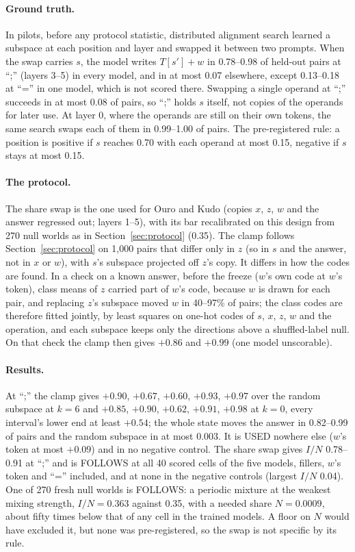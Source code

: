 \documentclass{article}
\begin{document}
\paragraph{Ground truth.} In pilots, before any protocol statistic, distributed alignment search \citep{geiger2024finding} learned a subspace at each position and layer and swapped it between two prompts. When the swap carries $s$, the model writes $T[s'] + w$ in 0.78--0.98 of held-out pairs at ``;'' (layers 3--5) in every model, and in at most 0.07 elsewhere, except 0.13--0.18 at ``='' in one model, which is not scored there. Swapping a single operand at ``;'' succeeds in at most 0.08 of pairs, so ``;'' holds $s$ itself, not copies of the operands for later use. At layer 0, where the operands are still on their own tokens, the same search swaps each of them in 0.99--1.00 of pairs. The pre-registered rule: a position is positive if $s$ reaches 0.70 with each operand at most 0.15, negative if $s$ stays at most 0.15.

\paragraph{The protocol.} The share swap is the one used for Ouro and Kudo (copies $x$, $z$, $w$ and the answer regressed out; layers 1--5), with its bar recalibrated on this design from 270 null worlds as in Section~\ref{sec:protocol} (0.35). The clamp follows Section~\ref{sec:protocol} on 1,000 pairs that differ only in $z$ (so in $s$ and the answer, not in $x$ or $w$), with $s$'s subspace projected off $z$'s copy. It differs in how the codes are found. In a check on a known answer, before the freeze ($w$'s own code at $w$'s token), class means of $z$ carried part of $w$'s code, because $w$ is drawn for each pair, and replacing $z$'s subspace moved $w$ in 40--97\% of pairs; the class codes are therefore fitted jointly, by least squares on one-hot codes of $s$, $x$, $z$, $w$ and the operation, and each subspace keeps only the directions above a shuffled-label null. On that check the clamp then gives $+0.86$ and $+0.99$ (one model unscorable).

\paragraph{Results.} At ``;'' the clamp gives $+0.90$, $+0.67$, $+0.60$, $+0.93$, $+0.97$ over the random subspace at $k = 6$ and $+0.85$, $+0.90$, $+0.62$, $+0.91$, $+0.98$ at $k = 0$, every interval's lower end at least $+0.54$; the whole state moves the answer in 0.82--0.99 of pairs and the random subspace in at most 0.003. It is USED nowhere else ($w$'s token at most $+0.09$) and in no negative control. The share swap gives $I/N$ 0.78--0.91 at ``;'' and is FOLLOWS at all 40 scored cells of the five models, fillers, $w$'s token and ``='' included, and at none in the negative controls (largest $I/N$ 0.04). One of 270 fresh null worlds is FOLLOWS: a periodic mixture at the weakest mixing strength, $I/N = 0.363$ against 0.35, with a needed share $N = 0.0009$, about fifty times below that of any cell in the trained models. A floor on $N$ would have excluded it, but none was pre-registered, so the swap is not specific by its rule.
\end{document}
